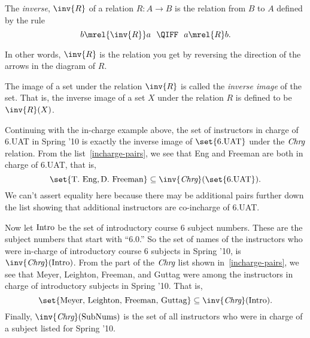 \begin{definition}
The \emph{inverse}, $\inv{R}$ of a relation $R: A \to B$ is the
relation from $B$ to $A$ defined by the rule
\[
b \mrel{\inv{R}} a\ \ \QIFF\ \ a \mrel{R} b.
\]
\end{definition}
In other words, $\inv{R}$ is the relation you get by reversing the
direction of the arrows in the diagram of $R$.

\begin{definition}
The image of a set under the relation $\inv{R}$ is called
the \emph{inverse image}%
 of the set.  That is, the inverse image of a
set $X$ under the relation $R$ is defined to be $\inv{R}(X)$.
\end{definition}

Continuing with the in-charge example above, the set of instructors in
charge of 6.UAT in Spring '10 is exactly the inverse image of
$\set{\text{6.UAT}}$ under the $\textit{Chrg}$ relation.  From the
list~\eqref{incharge-pairs}, we see that Eng and Freeman are both in
charge of 6.UAT, that is,
\[
\set{\text{T. Eng}, \text{D. Freeman}} \subseteq \inv{\inchrg}(\set{\text{6.UAT}}).
\]
We can't assert equality here because there may be additional pairs
further down the list showing that additional instructors are
co-incharge of 6.UAT.

Now let $\text{Intro}$ be the set of introductory course 6 subject
numbers.  These are the subject numbers that start with ``6.0.''  So
the set of names of the instructors who were in-charge of introductory
course 6 subjects in Spring '10, is $\inv{\inchrg}(\introsub)$.  From
the part of the $\textit{Chrg}$ list shown in~\eqref{incharge-pairs}, we see
that Meyer, Leighton, Freeman, and Guttag were among the instructors
in charge of introductory subjects in Spring '10.  That is,
\[
\set{\text{Meyer, Leighton, Freeman, Guttag}} \subseteq \inv{\inchrg}(\introsub).
\]
Finally, $\inv{\inchrg}(\subnums)$ is the set of all instructors who
were in charge of a subject listed for Spring '10.

\iffalse
It gets interesting when we write composite expressions mixing images,
inverse images and set operations.  For example, $T(\inv{T}(D))$ is
the set of Spring '09 subjects that have an instructor in charge who
also is in in charge of an introductory subject.  So $T(\inv{T}(D)) -
D$ are the advanced subjects with someone in-charge who is also
in-charge of an introductory subject.  Similarly, $\inv{T}(D) \intersect
\inv{T}(N-D)$ is the set of faculty in charge of both an introductory \emph{and}
an advanced subject in Spring '09.
\fi

